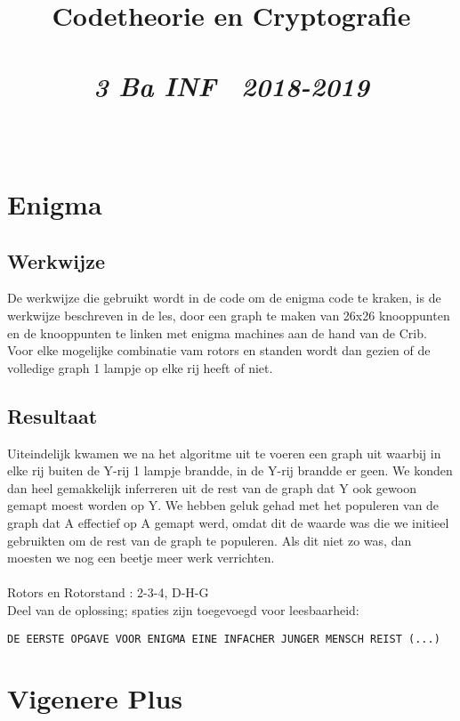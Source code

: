 \documentclass{article}
\title{\textmd{\textbf{Codetheorie en Cryptografie}}\\\normalsize\vspace{0.1in}\Large{\assignmentname}\\\vspace{0.1in}\small{\textit{3 Ba INF \  2018-2019}}}
\author{\studentA \\ \studentB}
\begin{document}
\maketitle

\section{Enigma}
\subsection{Werkwijze}
De werkwijze die gebruikt wordt in de code om de enigma code te kraken, is de werkwijze beschreven in de les, door een graph te maken van 26x26 knooppunten en de knooppunten te linken met enigma machines aan de hand van de Crib. Voor elke mogelijke combinatie vam rotors en standen wordt dan gezien of de volledige graph 1 lampje op elke rij heeft of niet.\\

\subsection{Resultaat}
Uiteindelijk kwamen we na het algoritme uit te voeren een graph uit waarbij in elke rij buiten de Y-rij 1 lampje brandde, in de Y-rij brandde er geen. We konden dan heel gemakkelijk inferreren uit de rest van de graph dat Y ook gewoon gemapt moest worden op Y. We hebben geluk gehad met het populeren van de graph dat A effectief op A gemapt werd, omdat dit de waarde was die we initieel gebruikten om de rest van de graph te populeren. Als dit niet zo was, dan moesten we nog een beetje meer werk verrichten. \\ \\
Rotors en Rotorstand : 2-3-4, D-H-G \\
Deel van de oplossing; spaties zijn toegevoegd voor leesbaarheid: 
\begin{verbatim}
DE EERSTE OPGAVE VOOR ENIGMA EINE INFACHER JUNGER MENSCH REIST (...) 
\end{verbatim} 

\section{Vigenere Plus}
\end{document}
